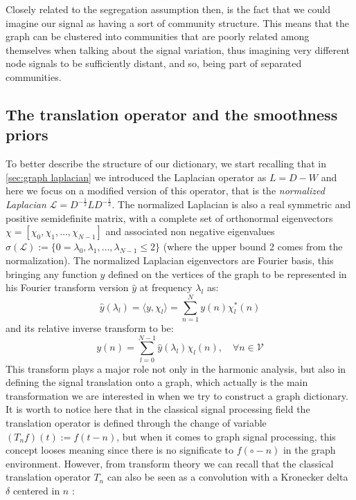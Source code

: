 Closely related to the segregation assumption then, is the fact that we could imagine our signal as having a sort of community structure. This means that the graph can be clustered into communities that are poorly related among themselves when talking about the signal variation, thus imagining very different node signals to be sufficiently distant, and so, being part of separated communities.


\subsection{The translation operator and the smoothness priors}
To better describe the structure of our dictionary, we start recalling that in \autoref{sec:graph laplacian} we introduced the Laplacian operator as $L = D - W$ and here we focus on a modified version of this operator, that is the \textit{normalized Laplacian} $\mathcal{L} = D^{-\frac{1}{2}}LD^{-\frac{1}{2}}$. The normalized Laplacian is also a real symmetric and positive semidefinite matrix, with a complete set of orthonormal eigenvectors $\textbf{$\chi$} = [\chi_0,\chi_1,\dots,\chi_{N-1}]$ and associated non negative eigenvalues $\sigma(\mathcal{L}) := \{ 0 = \lambda_0,\lambda_1,\dots,\lambda_{N-1} \leq 2 \}$ (where the upper bound 2 comes from the normalization).
The normalized Laplacian eigenvectors are Fourier basis, this bringing any function $y$ defined on the vertices of the graph to be represented in his Fourier transform version $\hat{y}$ at frequency $\lambda_l$ as:
\begin{equation}
\hat{y}(\lambda_l) = \langle y, \chi_l \rangle = \sum_{n=1}^{N} y(n)\chi_l^{*}(n)
\end{equation}
and its relative inverse transform to be:
\begin{equation}
y(n) = \sum_{l=0}^{N-1} \hat{y}(\lambda_l)\chi_l(n), \quad \forall n \in \mathcal{V}
\end{equation}
This transform plays a major role not only in the harmonic analysis, but also in defining the signal translation onto a graph, which actually is the main transformation we are interested in when we try to construct a graph dictionary. It is worth to notice here that in the classical signal processing field the translation operator is defined through the change of variable $(T_n f)(t) := f(t-n)$, but when it comes to graph signal processing, this concept looses meaning since there is no significate to $f(\circ - n)$ in the graph environment. However, from transform theory we can recall that the classical translation operator $T_n$ can also be seen as a convolution with a Kronecker delta $\delta$ centered in $n$\cite{Shuman2013} \cite{Thanou2014}:
